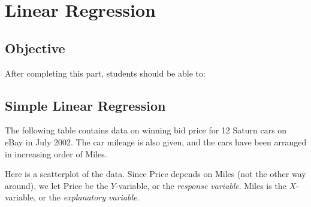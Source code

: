 \documentclass[11pt, chapterprefix=true]{scrbook}\usepackage[]{graphicx}\usepackage[]{color}
\begin{document}
\onecolumn



\chapter{Linear Regression}
\label{chap:ch14}

\section{Objective}

After completing this part, students should be able to:


\section{Simple Linear Regression}  

The following table contains data on winning bid price for 12 Saturn cars on eBay in July 2002.  The car mileage is also given, and the cars have been arranged in increasing order of Miles.

Here is a scatterplot of the data.  Since Price depends on Miles (not the other way around), we let Price be the $Y$-variable, or the \textit{response variable}.    Miles is the $X$-variable, or the \textit{explanatory variable}.
\end{document}
